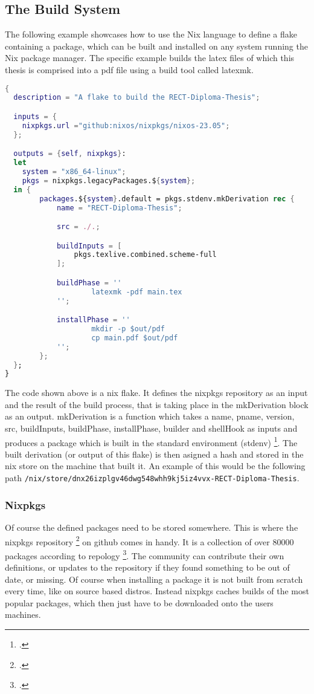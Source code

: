 \subsection{The Build System}
The following example showcases how to use the Nix language to define a flake containing a package, which can be built and installed on any system running the Nix package manager.
The specific example builds the latex files of which this thesis is comprised into a pdf file using a build tool called latexmk.
\medskip

\begin{minipage}{\textwidth}
\begin{lstlisting}[language=Nix, caption={The nix flake, that builds this diploma thesis}]
{
  description = "A flake to build the RECT-Diploma-Thesis";

  inputs = {
    nixpkgs.url ="github:nixos/nixpkgs/nixos-23.05";
  };

  outputs = {self, nixpkgs}:
  let
    system = "x86_64-linux";
    pkgs = nixpkgs.legacyPackages.${system};
  in {
		packages.${system}.default = pkgs.stdenv.mkDerivation rec {
			name = "RECT-Diploma-Thesis";

			src = ./.;

			buildInputs = [
				pkgs.texlive.combined.scheme-full
			];

			buildPhase = ''
					latexmk -pdf main.tex
			'';

			installPhase = '' 
					mkdir -p $out/pdf
					cp main.pdf $out/pdf
			'';
		};
  };
}
\end{lstlisting}
\end{minipage}

The code shown above is a nix flake. It defines the nixpkgs repository as an input and the result of the build process,
that is taking place in the mkDerivation block as an output. mkDerivation is a function which takes a name, pname, version, src,
buildInputs, buildPhase, installPhase, builder and shellHook as inputs and produces a package which is built in the standard environment (stdenv) \footcite{nixMkDerivation}.
The built derivation (or output of this flake) is then asigned a hash and stored in the nix store on the machine that built it.
An example of this would be the following path \newline\verb+/nix/store/dnx26izplgv46dwg548whh9kj5iz4vvx-RECT-Diploma-Thesis+. 

\subsubsection{Nixpkgs}
Of course the defined packages need to be stored somewhere. This is where the nixpkgs repository \footcite{nixpkgs_repo} on github comes in handy. It is a collection of over 80000 packages according to repology \footcite{repology_nixpkgs}.
The community can contribute their own definitions, or updates to the repository if they found something to be out of date, or missing. Of course when installing a package it is not built from scratch every time, like on source based distros.
Instead nixpkgs caches builds of the most popular packages, which then just have to be downloaded onto the users machines.

